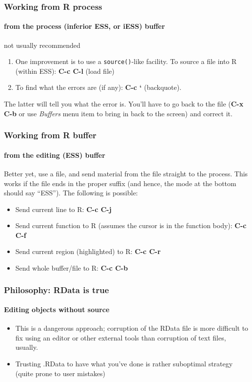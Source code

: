 \documentclass{beamer}
\begin{document}
\begin{frame}[fragile]
  \frametitle{Working from R process}
  \framesubtitle{from the process (inferior ESS, or iESS) buffer}
  \alert{not usually recommended}
  \begin{enumerate}
  \item One improvement is to use a \verb+source()+-like facility.  To
    source a file into R (within ESS): \textbf{C-c C-l} (load file)
  \item To find what the errors are (if any): \textbf{C-c `} (backquote).
  \end{enumerate}
  The latter will tell you what the error is.  You'll have to go back
  to the file (\textbf{C-x C-b} or use \textit{Buffers} menu item to
  bring in back to the screen) and correct it.
\end{frame}

\begin{frame}[fragile]
  \frametitle{Working from R buffer}
  \framesubtitle{from the editing (ESS) buffer}
  Better yet, use a file, and send material from the file straight to
  the process.  This works if the file ends in the proper suffix (and
  hence, the mode at the bottom should say ``ESS'').  The following is
  possible:
  \begin{itemize}
  \item Send current line to R: \textbf{C-c C-j}
  \item Send current function to R (assumes the cursor is in the
    function body): \textbf{C-c C-f}
  \item Send current region (highlighted) to R: \textbf{C-c C-r}
  \item Send whole buffer/file to R: \textbf{C-c C-b}
  \end{itemize}
\end{frame}

\begin{frame}
  \frametitle{Philosophy: RData is true}
  \framesubtitle{Editing objects without source}
  \begin{itemize}
  \item This is a dangerous approach; corruption of the RData file is
    more difficult to fix using an editor or other external tools than
    corruption of text files, usually.
  \item Trusting .RData to have what you've done is rather suboptimal
    strategy (quite prone to user mistakes)
  \end{itemize}
\end{frame}
\end{document}

